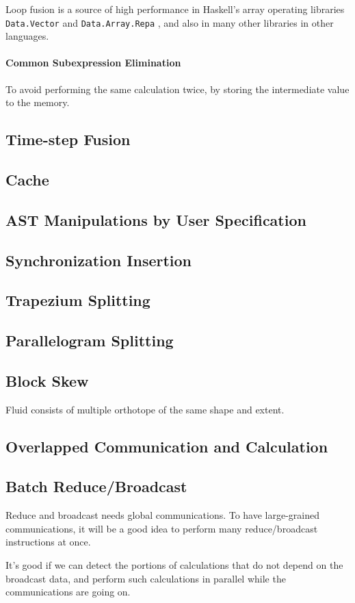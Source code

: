 \documentclass[twocolumn]{article}
\begin{document}
Loop fusion is a source of high performance in Haskell's array operating
libraries {\tt Data.Vector} and {\tt Data.Array.Repa}
\cite{Keller:2010:RSP:1932681.1863582}, and also in many other libraries in
other languages.


\paragraph{Common Subexpression Elimination}

To avoid performing the same calculation twice, by storing the intermediate
value to the memory. 

\subsection{Time-step Fusion}
\subsection{Cache}
\subsection{AST Manipulations by User Specification}
\subsection{Synchronization Insertion}
\subsection{Trapezium Splitting}
\subsection{Parallelogram Splitting}
\subsection{Block Skew}
Fluid consists of multiple orthotope of the same shape and extent.
\subsection{Overlapped Communication and Calculation}
\subsection{Batch Reduce/Broadcast}
Reduce and broadcast needs global communications. To have large-grained
communications, it will be a good idea to perform many reduce/broadcast
instructions at once. 

It's good if we can detect the portions of calculations that do not depend on
the broadcast data, and perform such calculations in parallel while the
communications are going on.


\end{document}
